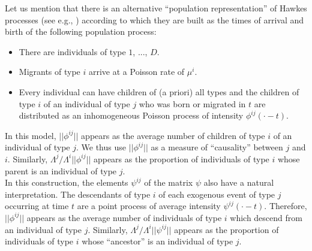 \documentclass[a4paper,11pt]{article}
\begin{document}
\noindent Let us mention that there is an alternative ``population representation'' of Hawkes processes (see e.g., \cite{hawkes1974cluster}) according to which
they are built as the times of arrival and birth of the following population process:
\begin{itemize}
\item{There are individuals of type $1$, ..., $D$.}
\item{Migrants of type $i$ arrive at a Poisson rate of $\mu^i$.}
\item{Every individual can have children of (a priori) all types and the children of type $i$ of an individual of type $j$ who was born or migrated in $t$ are distributed as an inhomogeneous Poisson process of intensity $\phi^{ij}(\cdot -t)$. }
\end{itemize}
In this model, $||\phi^{ij}||$ appears as the average number of children of type $i$ of an individual of type $j$. We thus use $||\phi^{ij}||$ as a measure of ``causality'' between $j$ and $i$. Similarly, $\Lambda^j/\Lambda^i ||\phi^{ij}||$ appears as the proportion of individuals of type $i$ whose parent is an individual of type $j$.\\

\noindent In this construction, the elements $\psi^{ij}$ of the matrix $\psi$ also have a natural interpretation. The descendants of type $i$ of each exogenous event of type $j$ occurring at time $t$ are a point process of average intensity $\psi^{ij}(\cdot-t)$. Therefore, $||\phi^{ij}||$ appears as the average number of individuals of type $i$ which descend from an individual of type $j$. Similarly, $\Lambda^j/\Lambda^i ||\psi^{ij}||$ appears as the proportion of individuals of type $i$ whose ``ancestor'' is an individual of type $j$.\\
\end{document}
